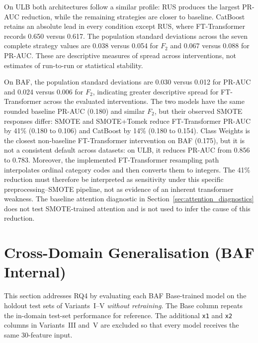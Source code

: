 On ULB both architectures follow a similar profile: RUS produces the largest PR-AUC reduction, while the remaining strategies are closer to baseline. CatBoost retains an absolute lead in every condition except RUS, where FT-Transformer records 0.650 versus 0.617. The population standard deviations across the seven complete strategy values are 0.038 versus 0.054 for $F_2$ and 0.067 versus 0.088 for PR-AUC. These are descriptive measures of spread across interventions, not estimates of run-to-run or statistical stability.

On BAF, the population standard deviations are 0.030 versus 0.012 for PR-AUC and 0.024 versus 0.006 for $F_2$, indicating greater descriptive spread for FT-Transformer across the evaluated interventions. The two models have the same rounded baseline PR-AUC (0.180) and similar $F_2$, but their observed SMOTE responses differ: SMOTE and SMOTE+Tomek reduce FT-Transformer PR-AUC by 41\% (0.180 to 0.106) and CatBoost by 14\% (0.180 to 0.154). Class Weights is the closest non-baseline FT-Transformer intervention on BAF (0.175), but it is not a consistent default across datasets: on ULB, it reduces PR-AUC from 0.856 to 0.783. Moreover, the implemented FT-Transformer resampling path interpolates ordinal category codes and then converts them to integers. The 41\% reduction must therefore be interpreted as sensitivity under this specific preprocessing--SMOTE pipeline, not as evidence of an inherent transformer weakness. The baseline attention diagnostic in Section~\ref{sec:attention_diagnostics} does not test SMOTE-trained attention and is not used to infer the cause of this reduction.


\section{Cross-Domain Generalisation (BAF Internal)}
\label{sec:cross_domain_results}

This section addresses RQ4 by evaluating each BAF Base-trained model on the holdout test sets of Variants~I--V \emph{without retraining}. The Base column repeats the in-domain test-set performance for reference. The additional \texttt{x1} and \texttt{x2} columns in Variants~III and~V are excluded so that every model receives the same 30-feature input.

